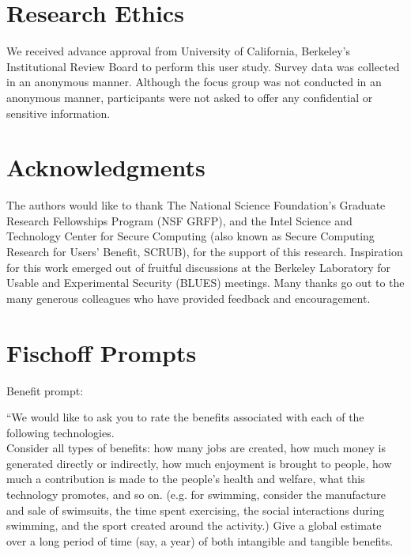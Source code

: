 \documentclass{acm_proc_article-sp}
\begin{document}

\section{Research Ethics} 
We received advance approval from University of California, Berkeley's Institutional Review Board to perform this user study. Survey data was collected in an anonymous manner. Although the focus group was not conducted in an anonymous manner, participants were not asked to offer any confidential or sensitive information. 

\section{Acknowledgments}
The authors would like to thank The National Science Foundation's Graduate Research Fellowships Program (NSF GRFP), and the Intel Science and Technology Center for Secure Computing (also known as  Secure Computing Research for Users' Benefit, SCRUB), for the support of this research. Inspiration for this work emerged out of fruitful discussions at the Berkeley Laboratory for Usable and Experimental Security (BLUES) meetings. Many thanks go out to the many generous colleagues who have provided feedback and encouragement.







\appendix
\section{Fischoff Prompts}
\label{sec:prompt}

Benefit prompt: 

``We would like to ask you to rate the benefits associated with each of the following technologies.  \\[-.6cm]

Consider all types of benefits: how many jobs are created, how much money is generated directly or indirectly, how much enjoyment is brought to people, how much a contribution is made to the people's health and welfare, what this technology promotes, and so on. (e.g. for swimming, consider the manufacture and sale of swimsuits, the time spent exercising, the social interactions during swimming, and the sport created around the activity.) Give a global estimate over a long period of time (say, a year) of both intangible and tangible benefits. \\[-.6cm]
\end{document}
